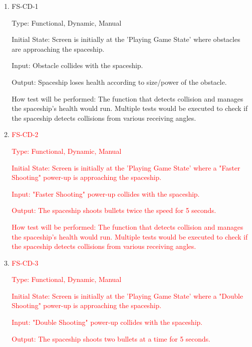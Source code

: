 \documentclass[12pt, titlepage]{article}
\begin{document}
\begin{enumerate}

\item{FS-CD-1\\}

Type: Functional, Dynamic, Manual
					
Initial State: Screen is initially at the 'Playing Game State' where obstacles are approaching the spaceship.
					
Input: Obstacle collides with the spaceship.  
					
Output: Spaceship loses health according to size/power of the obstacle. 
					
How test will be performed: The function that detects collision and manages the spaceship's health would run. Multiple tests would be executed to check if the spaceship detects collisions from various receiving angles. 

\item\textcolor{red}{FS-CD-2\\}
	
\textcolor{red}{Type: Functional, Dynamic, Manual}
				
\textcolor{red}{Initial State: Screen is initially at the 'Playing Game State' where a "Faster Shooting" power-up is approaching the spaceship.}
					
\textcolor{red}{Input: "Faster Shooting" power-up collides with the spaceship.}
					
\textcolor{red}{Output: The spaceship shoots bullets twice the speed for 5 seconds.}

\textcolor{red}{How test will be performed: The function that detects collision and manages the spaceship's health would run. Multiple tests would be executed to check if the spaceship detects collisions from various receiving angles.}

\item\textcolor{red}{FS-CD-3\\}
			
\textcolor{red}{Type: Functional, Dynamic, Manual}
		
\textcolor{red}{Initial State: Screen is initially at the 'Playing Game State' where a "Double Shooting" power-up is approaching the spaceship.}
					
\textcolor{red}{Input: "Double Shooting" power-up collides with the spaceship.}

\textcolor{red}{Output: The spaceship shoots two bullets at a time for 5 seconds.}


\end{enumerate}
\end{document}
